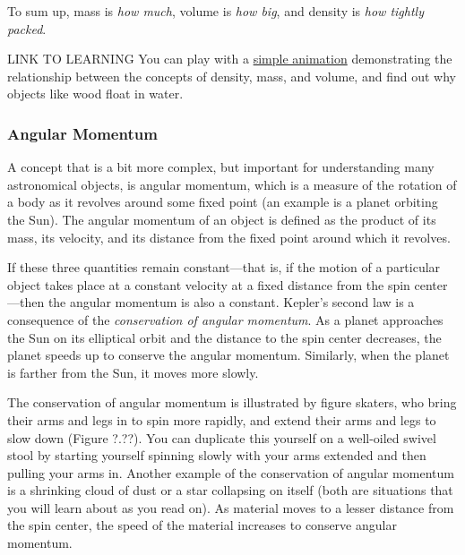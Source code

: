 \documentclass[../../main-astronomy.tex]{subfiles}
\begin{document}
To sum up, mass is \textit{how much}, volume is \textit{how big}, and density is \textit{how tightly packed}.

\begin{gradient}{LINK TO LEARNING}
    You can play with a \href{https://openstax.org/l/30phetsimdenmas}{simple animation} demonstrating the relationship between the concepts of density, mass, and volume, and find out why objects like wood float in water.
\end{gradient}

\subsubsection*{Angular Momentum}

A concept that is a bit more complex, but important for understanding many astronomical objects, is \gls{angular momentum}, which is a measure of the rotation of a body as it revolves around some fixed point (an example is a planet orbiting the Sun). The angular momentum of an object is defined as the product of its mass, its velocity, and its distance from the fixed point around which it revolves.

\vspace{1em}

If these three quantities remain constant---that is, if the motion of a particular object takes place at a constant velocity at a fixed distance from the spin center---then the angular momentum is also a constant. Kepler’s second law is a consequence of the \textit{conservation of angular momentum}. As a planet approaches the Sun on its elliptical orbit and the distance to the spin center decreases, the planet speeds up to conserve the angular momentum. Similarly, when the planet is farther from the Sun, it moves more slowly.

\vspace{1em}

The conservation of angular momentum is illustrated by figure skaters, who bring their arms and legs in to spin more rapidly, and extend their arms and legs to slow down (Figure ?.??). You can duplicate this yourself on a well-oiled swivel stool by starting yourself spinning slowly with your arms extended and then pulling your arms in. Another example of the conservation of angular momentum is a shrinking cloud of dust or a star collapsing on itself (both are situations that you will learn about as you read on). As material moves to a lesser distance from the spin center, the speed of the material increases to conserve angular momentum.

\vspace{1em} %
\end{document}
